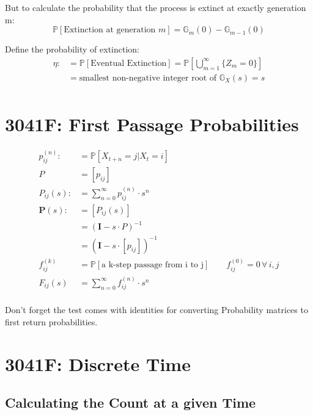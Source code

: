 But to calculate the probability that the process is extinct at exactly generation m:
\begin{equation*}
    \mathbb{P}[\text{Extinction at generation } m] = \mathbb{G}_m(0) - \mathbb{G}_{m-1}(0)
\end{equation*}

Define the probability of extinction:
\begin{equation*}
    \begin{aligned}
        \eta :&= \mathbb{P}[\text{Eventual Extinction}] = \mathbb{P}\left[\bigcup_{m=1}^{\infty} \{ Z_m = 0 \}\right] \\
              &= \text{smallest non-negative integer root of } \mathbb{G}_X(s) = s \\
    \end{aligned}
\end{equation*}
\section{3041F: First Passage Probabilities}
\begin{equation*}
    \begin{aligned}
        p_{ij}^{(n)} :&= \mathbb{P}[X_{t+n} = j | X_{t} = i]  \\
        P &= \left[ p_{ij}\right]\\
        P_{ij}(s) :&= \sum_{n=0}^{\infty} p_{ij}^{(n)} \cdot s^n \\
        \mathbf{P}(s) :&= \left[ P_{ij}(s) \right]\\
                       &= \left( \mathbf{I} - s \cdot P \right)^{-1}\\
                       &= \left( \mathbf{I} - s \cdot \left[ p_{ij}\right] \right)^{-1}\\
        f_{ij}^{(k)} &= \mathbb{P}[\text{a k-step passage from i to j}] \qquad f_{ij}^{(0)} = 0 \,\forall\, i, j \\
        F_{ij}(s) &= \sum_{n=0}^{\infty} f_{ij}^{(n)} \cdot s^n \\
    \end{aligned}
\end{equation*}

Don't forget the test comes with identities for converting Probability matrices to first return probabilities.
\section{3041F: Discrete Time}
\subsection{Calculating the Count at a given Time}
